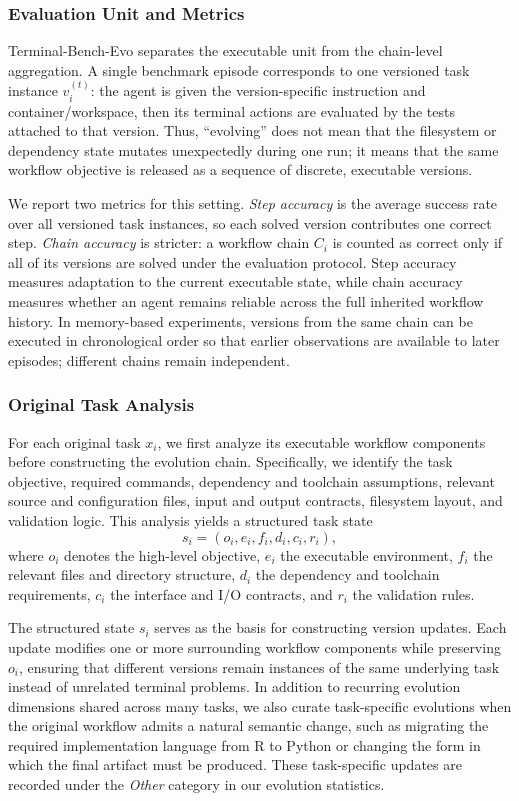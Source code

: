 \documentclass{llmxive}
\begin{document}
\subsubsection{Evaluation Unit and Metrics}
\label{app:terminal_eval_unit_metrics}
Terminal-Bench-Evo separates the executable unit from the chain-level aggregation. A single benchmark episode corresponds to one versioned task instance $v_i^{(t)}$: the agent is given the version-specific instruction and container/workspace, then its terminal actions are evaluated by the tests attached to that version. Thus, ``evolving'' does not mean that the filesystem or dependency state mutates unexpectedly during one run; it means that the same workflow objective is released as a sequence of discrete, executable versions.

We report two metrics for this setting. \emph{Step accuracy} is the average success rate over all versioned task instances, so each solved version contributes one correct step. \emph{Chain accuracy} is stricter: a workflow chain $C_i$ is counted as correct only if all of its versions are solved under the evaluation protocol. Step accuracy measures adaptation to the current executable state, while chain accuracy measures whether an agent remains reliable across the full inherited workflow history. In memory-based experiments, versions from the same chain can be executed in chronological order so that earlier observations are available to later episodes; different chains remain independent.


\subsubsection{Original Task Analysis}
\label{app:terminal_task_analysis}
For each original task $x_i$, we first analyze its executable workflow components before constructing the evolution chain. Specifically, we identify the task objective, required commands, dependency and toolchain assumptions, relevant source and configuration files, input and output contracts, filesystem layout, and validation logic. This analysis yields a structured task state
\[
s_i = (o_i, e_i, f_i, d_i, c_i, r_i),
\]
where $o_i$ denotes the high-level objective, $e_i$ the executable environment, $f_i$ the relevant files and directory structure, $d_i$ the dependency and toolchain requirements, $c_i$ the interface and I/O contracts, and $r_i$ the validation rules.

The structured state $s_i$ serves as the basis for constructing version updates. Each update modifies one or more surrounding workflow components while preserving $o_i$, ensuring that different versions remain instances of the same underlying task instead of unrelated terminal problems. In addition to recurring evolution dimensions shared across many tasks, we also curate task-specific evolutions when the original workflow admits a natural semantic change, such as migrating the required implementation language from R to Python or changing the form in which the final artifact must be produced. These task-specific updates are recorded under the \emph{Other} category in our evolution statistics.
\end{document}
